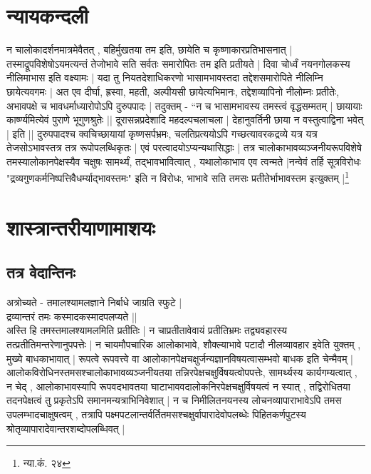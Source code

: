 \section{न्यायकन्दली} न चालोकादर्शनमात्रमेवैतत् , बहिर्मुखतया तम इति, छायेति च कृष्णाकारप्रतिभासनात् | तस्माद्रूपविशेषोऽयमत्यन्तं तेजोभावे सति सर्वतः समारोपितः तम इति प्रतीयते | दिवा चोर्ध्वं नयनगोलकस्य नीलिमाभास इति वक्ष्यामः | यदा तु नियतदेशाधिकरणो भासामभावस्तदा तद्देशसमारोपिते नीलिम्नि छायेत्यवगमः | अत एव दीर्घा, ह्रस्वा, महती, अल्पीयसी छायेत्यभिमानः, तद्देशव्यापिनो नीलोम्नः प्रतीतेः, अभावपक्षे च भावधर्माध्यारोपोऽपि दुरुपपादः | तदुक्तम् - “न च भासामभावस्य तमस्त्वं वृद्धसम्मतम् | छायायाः कार्ष्ण्यमित्येवं पुराणे भूगुणश्रुतेः || दूरासन्नप्रदेशादि  महदल्पचलाचला | देहानुवर्तिनी छाया न वस्तुत्वाद्विना भवेत् | इति || दुरुपपादश्च क्वचिच्छायायां कृष्णसर्पभ्रमः, चलतिप्रत्ययोऽपि गच्छत्यावरकद्रव्ये यत्र यत्र तेजसोऽभावस्तत्र तत्र रूपोपलब्धिकृतः | एवं परत्वादयोऽप्यन्यथासिद्धाः | तत्र चालोकाभावव्यञ्जनीयरूपविशेषे तमस्यालोकानपेक्षस्यैव चक्षुषः सामर्थ्यं, तद्भावभावित्वात् , यथालोकाभाव एव त्वन्मते |नन्वेवं तर्हि सूत्रविरोधः "द्रव्यगुणकर्मनिष्पत्तिवैधर्म्याद्भावस्तमः" इति न विरोधः, भाभावे सति तमसः प्रतीतेर्भाभावस्तम इत्युक्तम् |\footnote{न्या.कं. २४} 

\section{शास्त्रान्तरीयाणामाशयः}

\subsection{तत्र वेदान्तिनः} अत्रोच्यते - तमालश्यामलज्ञाने निर्बाधे जाग्रति स्फुटे |\\ [-3mm] द्रव्यान्तरं तमः कस्मादकस्मादपलप्यते ||\\ अस्ति हि तमस्तमालश्यामलमिति प्रतीतिः | न चाप्रतीतावेवायं प्रतीतिभ्रमः‌ तद्व्यवहारस्य तत्प्रतीतिमन्तरेणानुपपत्तेः | न चायमौपचारिक आलोकाभावे, शौक्ल्याभावे पटादौ नीलव्यावहार इवेति युक्तम् , मुख्ये बाधकाभावात् | रूपत्वे रूपवत्त्वे वा आलोकानपेक्षचक्षुर्जन्यज्ञानविषयत्वासम्भवो बाधक इति चेन्मैवम् | आलोकविरोधिनस्तमसश्चालोकाभावव्यञ्जनीयतया तन्निरपेक्षचक्षुर्विषयत्वोपपत्तेः, सामर्थ्यस्य कार्यगम्यत्वात् , न चेद् , आलोकाभावस्यापि रूपवदभावतया घाटाभाववदालोकनिरपेक्षचक्षुर्विषयत्वं न स्यात् , तद्विरोधितया तदनपेक्षत्वं तु प्रकृतेऽपि समानमन्यत्राभिनिवेशात् | न च निमीलितनयनस्य लोचनव्यापाराभावेऽपि तमस उपलम्भादचाक्षुषत्वम् , तत्रापि पक्ष्मपटलान्तर्वर्तितमसश्चक्षुर्वापारादेवोपलब्धेः पिहितकर्णपुटस्य श्रोतृव्यापारादेवान्तरशब्दोपलब्धिवत् |

